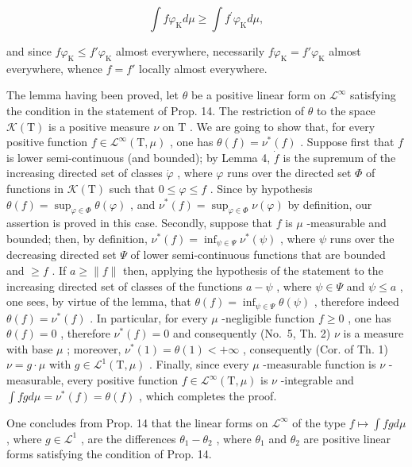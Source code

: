 \[
\int f \varphi_ {\mathrm{K}} d \mu \geqslant \int f ^ {\prime} \varphi_ {\mathrm{K}} d \mu ,
\]

and since \(f\varphi_{\mathrm{K}} \leqslant f'\varphi_{\mathrm{K}}\) almost everywhere, necessarily \(f\varphi_{\mathrm{K}} = f'\varphi_{\mathrm{K}}\) almost everywhere, whence \(f = f'\) locally almost everywhere.

The lemma having been proved, let \(\theta\) be a positive linear form on \(\mathcal{L}^{\infty}\) satisfying the condition in the statement of Prop. 14. The restriction of \(\theta\) to the space \(\mathcal{K}(\mathrm{T})\) is a positive measure \(\nu\) on \(\mathrm{T}\) . We are going to show that, for every positive function \(f\in \mathcal{L}^{\infty}(\mathrm{T},\mu)\) , one has \(\theta (f) = \nu^{*}(f)\) . Suppose first that \(f\) is lower semi-continuous (and bounded); by Lemma 4, \(\dot{f}\) is the supremum of the increasing directed set of classes \(\dot{\varphi}\) , where \(\varphi\) runs over the directed set \(\Phi\) of functions in \(\mathcal{K}(\mathrm{T})\) such that \(0\leqslant \varphi \leqslant f\) . Since by hypothesis \(\theta (f) = \sup_{\varphi \in \Phi}\theta (\varphi)\) , and \(\nu^{*}(f) = \sup_{\varphi \in \Phi}\nu (\varphi)\) by definition, our assertion is proved in this case. Secondly, suppose that \(f\) is \(\mu\) -measurable and bounded; then, by definition, \(\nu^{*}(f) = \inf_{\psi \in \Psi}\nu^{*}(\psi)\) , where \(\psi\) runs over the decreasing directed set \(\Psi\) of lower semi-continuous functions that are bounded and \(\geqslant f\) . If \(a\geqslant \| f\|\) then, applying the hypothesis of the statement to the increasing directed set of classes of the functions \(a - \psi\) , where \(\psi \in \Psi\) and \(\psi \leqslant a\) , one sees, by virtue of the lemma, that \(\theta (f) = \inf_{\psi \in \Psi}\theta (\psi)\) , therefore indeed \(\theta (f) = \nu^{*}(f)\) . In particular, for every \(\mu\) -negligible function \(f\geqslant 0\) , one has \(\theta (f) = 0\) , therefore \(\nu^{*}(f) = 0\) and consequently (No.~5, Th. 2) \(\nu\) is a measure with base \(\mu\) ; moreover, \(\nu^{*}(1) = \theta (1) < +\infty\) , consequently (Cor. of Th. 1) \(\nu = g\cdot \mu\) with \(g\in \mathcal{L}^1 (\mathrm{T},\mu)\) . Finally, since every \(\mu\) -measurable function is \(\nu\) -measurable, every positive function \(f\in \mathcal{L}^{\infty}(\mathrm{T},\mu)\) is \(\nu\) -integrable and \(\int fg d\mu = \nu^{*}(f) = \theta (f)\) , which completes the proof.

One concludes from Prop. 14 that the linear forms on \(\mathcal{L}^{\infty}\) of the type \(f\mapsto \int fg d\mu\) , where \(g\in \mathcal{L}^{1}\) , are the differences \(\theta_{1} - \theta_{2}\) , where \(\theta_{1}\) and \(\theta_{2}\) are positive linear forms satisfying the condition of Prop. 14.

